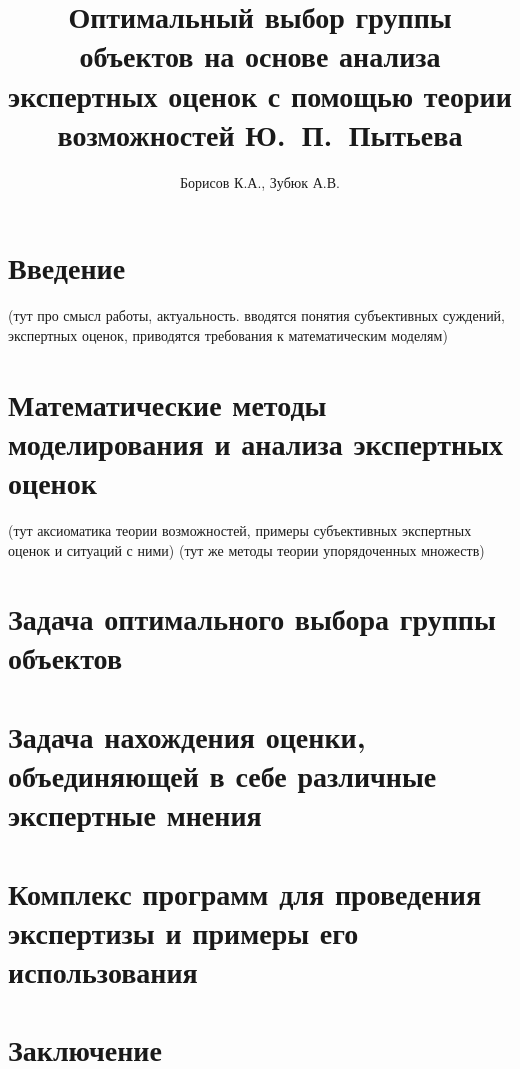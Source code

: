 \documentclass{article}
\begin{document}

\thispagestyle{empty}			

\title{Оптимальный выбор группы объектов на основе анализа экспертных оценок с помощью теории возможностей Ю.~П.~Пытьева} 
\author{Борисов К.А., Зубюк А.В.}
\maketitle

\tableofcontents
\newpage

\section{Введение} 
(тут про смысл работы, актуальность. вводятся понятия субъективных суждений, экспертных оценок, приводятся требования к математическим моделям)
% 

\section{Математические методы моделирования и анализа экспертных оценок}
(тут аксиоматика теории возможностей, примеры субъективных экспертных оценок и ситуаций с ними)
(тут же методы теории упорядоченных множеств)
% 

\section{Задача оптимального выбора группы объектов}


\section{Задача нахождения оценки, объединяющей в себе различные экспертные мнения}
% 

\section{Комплекс программ для проведения экспертизы и примеры его использования }


\section{Заключение}
% 

\end{document}
